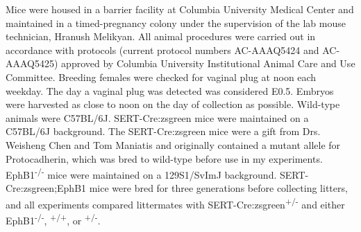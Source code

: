 Mice were housed in a barrier facility at Columbia University Medical Center and maintained in a timed-pregnancy colony under the supervision of the lab mouse technician, Hranush Melikyan.
All animal procedures were carried out in accordance with protocols (current protocol numbers AC-AAAQ5424 and AC-AAAQ5425) approved by Columbia University Institutional Animal Care and Use Committee. 
Breeding females were checked for vaginal plug at noon each weekday.
The day a vaginal plug was detected was considered E0.5.
Embryos were harvested as close to noon on the day of collection as possible.
Wild-type animals were C57BL/6J.
SERT-Cre:zsgreen mice were maintained on a C57BL/6J background.
The SERT-Cre:zsgreen mice were a gift from Drs. Weisheng Chen and Tom Maniatis and originally contained a mutant allele for Protocadherin, which was bred to wild-type before use in my experiments.
EphB1\textsuperscript{-/-} mice were maintained on a 129S1/SvImJ background.
SERT-Cre:zsgreen;EphB1 mice were bred for three generations before collecting litters, and all experiments compared littermates with SERT-Cre:zsgreen\textsuperscript{+/-} and either EphB1\textsuperscript{-/-}, \textsuperscript{+/+}, or \textsuperscript{+/-}.